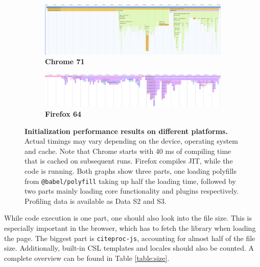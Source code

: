 \documentclass[fleqn,10pt,lineno]{wlpeerj} %
\begin{document}
\begin{figure}[bt!]
\begin{subfigure}{\textwidth}
\centering
\includegraphics[width=\linewidth]{figures/perf_chrome.png}
\caption{\textbf{Chrome 71}}
\label{fig:perf-chrome}
\end{subfigure}
\begin{subfigure}{\textwidth}
  \centering
  \includegraphics[width=\linewidth]{figures/perf_ff.png}
  \caption{\textbf{Firefox 64}}
  \label{fig:perf-ff}
\end{subfigure}
\caption{\textbf{Initialization performance results on different platforms.}
Actual timings may vary depending on the device, operating system and cache. Note that Chrome starts with 40 ms of compiling time that is cached on subsequent runs. Firefox compiles JIT, while the code is running. Both graphs show three parts, one loading polyfills from \texttt{@babel/polyfill} taking up half the loading time, followed by two parts mainly loading core functionality and plugins respectively. Profiling data is available as Data S2 and S3.}
\label{fig:perf}
\end{figure}

While code execution is one part, one should also look into the file size. This is especially important in the browser, which has to fetch the library when loading the page. The biggest part is \texttt{citeproc-js}, accounting for almost half of the file size. Additionally, built-in CSL templates and locales should also be counted. A complete overview can be found in Table \ref{table:size}.
\end{document}
